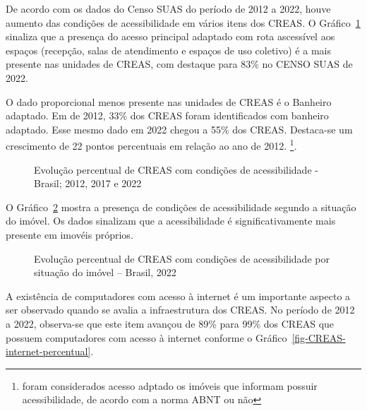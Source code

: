 \documentclass[
  letterpaper,
  DIV=11,
  numbers=noendperiod]{scrreprt}
\begin{document}
De acordo com os dados do Censo SUAS do período de 2012 a 2022, houve
aumento das condições de acessibilidade em vários itens dos CREAS. O
Gráfico~\ref{fig-creas-acessibilidade} sinaliza que a presença do acesso
principal adaptado com rota ascessível aos espaços (recepção, salas de
atendimento e espaços de uso coletivo) é a mais presente nas unidades de
CREAS, com destaque para 83\% no CENSO SUAS de 2022.

O dado proporcional menos presente nas unidades de CREAS é o Banheiro
adaptado. Em de 2012, 33\% dos CREAS foram identificados com banheiro
adaptado. Esse mesmo dado em 2022 chegou a 55\% dos CREAS. Destaca-se um
crescimento de 22 pontos percentuais em relação ao ano de 2012.
\footnote{foram considerados acesso adptado os imóveis que informam
  possuir acessibilidade, de acordo com a norma ABNT ou não}.

\begin{figure}


\caption{\label{fig-creas-acessibilidade}Evolução percentual de CREAS
com condições de acessibilidade - Brasil; 2012, 2017 e 2022}

\end{figure}%

O Gráfico~\ref{fig-CREAS-acessibilidade-situacao} mostra a presença de
condições de acessibilidade segundo a situação do imóvel. Os dados
sinalizam que a acessibilidade é significativamente mais presente em
imovéis próprios.

\begin{figure}


\caption{\label{fig-CREAS-acessibilidade-situacao}Evolução percentual de
CREAS com condições de acessibilidade por situação do imóvel -- Brasil,
2022}

\end{figure}%

A existência de computadores com acesso à internet é um importante
aspecto a ser observado quando se avalia a infraestrutura dos CREAS. No
período de 2012 a 2022, observa-se que este item avançou de 89\% para
99\% dos CREAS que possuem computadores com acesso à internet conforme o
Gráfico~\ref{fig-CREAS-internet-percentual}.
\end{document}
